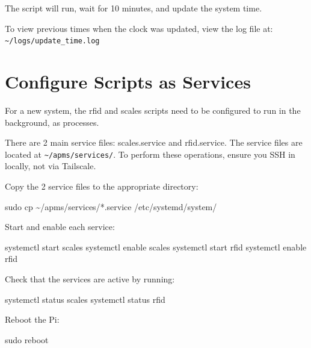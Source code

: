 \documentclass[
  letterpaper,
]{scrbook}
\newenvironment{Shaded}{\begin{snugshade}}{\end{snugshade}}
\newcommand{\ExtensionTok}[1]{\textcolor[rgb]{0.00,0.23,0.31}{#1}}
\newcommand{\FunctionTok}[1]{\textcolor[rgb]{0.28,0.35,0.67}{#1}}
\newcommand{\NormalTok}[1]{\textcolor[rgb]{0.00,0.23,0.31}{#1}}
\newcommand{\PreprocessorTok}[1]{\textcolor[rgb]{0.68,0.00,0.00}{#1}}
\begin{document}
The script will run, wait for 10 minutes, and update the system time.

To view previous times when the clock was updated, view the log file at:
\texttt{\textasciitilde{}/logs/update\_time.log}

\section{Configure Scripts as
Services}\label{configure-scripts-as-services}

For a new system, the rfid and scales scripts need to be configured to
run in the background, as processes.

There are 2 main service files: scales.service and rfid.service. The
service files are located at \texttt{\textasciitilde{}/apms/services/}.
To perform these operations, ensure you SSH in locally, not via
Tailscale.

Copy the 2 service files to the appropriate directory:

\begin{Shaded}
\begin{Highlighting}[]
\FunctionTok{sudo}\NormalTok{ cp \textasciitilde{}/apms/services/}\PreprocessorTok{*}\NormalTok{.service /etc/systemd/system/}
\end{Highlighting}
\end{Shaded}

Start and enable each service:

\begin{Shaded}
\begin{Highlighting}[]
\ExtensionTok{systemctl}\NormalTok{ start scales}
\ExtensionTok{systemctl}\NormalTok{ enable scales}
\ExtensionTok{systemctl}\NormalTok{ start rfid}
\ExtensionTok{systemctl}\NormalTok{ enable rfid}
\end{Highlighting}
\end{Shaded}

Check that the services are active by running:

\begin{Shaded}
\begin{Highlighting}[]
\ExtensionTok{systemctl}\NormalTok{ status scales}
\ExtensionTok{systemctl}\NormalTok{ status rfid}
\end{Highlighting}
\end{Shaded}

Reboot the Pi:

\begin{Shaded}
\begin{Highlighting}[]
\FunctionTok{sudo}\NormalTok{ reboot}
\end{Highlighting}
\end{Shaded}
\end{document}
